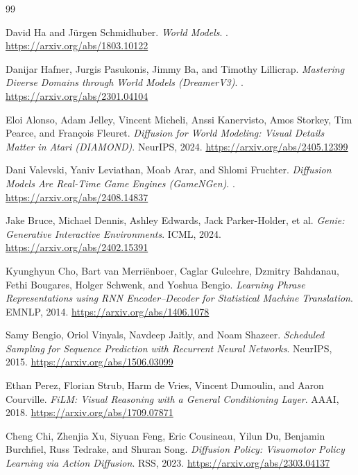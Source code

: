 \documentclass[11pt]{article}
\begin{document}
\newpage
\begin{thebibliography}{99}

David Ha and J\"urgen Schmidhuber.
\newblock \textit{World Models}.
.
\newblock \url{https://arxiv.org/abs/1803.10122}

Danijar Hafner, Jurgis Pasukonis, Jimmy Ba, and Timothy Lillicrap.
\newblock \textit{Mastering Diverse Domains through World Models (DreamerV3)}.
.
\newblock \url{https://arxiv.org/abs/2301.04104}

Eloi Alonso, Adam Jelley, Vincent Micheli, Anssi Kanervisto, Amos Storkey, Tim Pearce, and Fran\c{c}ois Fleuret.
\newblock \textit{Diffusion for World Modeling: Visual Details Matter in Atari (DIAMOND)}.
\newblock NeurIPS, 2024.
\newblock \url{https://arxiv.org/abs/2405.12399}

Dani Valevski, Yaniv Leviathan, Moab Arar, and Shlomi Fruchter.
\newblock \textit{Diffusion Models Are Real-Time Game Engines (GameNGen)}.
.
\newblock \url{https://arxiv.org/abs/2408.14837}

Jake Bruce, Michael Dennis, Ashley Edwards, Jack Parker-Holder, et al.
\newblock \textit{Genie: Generative Interactive Environments}.
\newblock ICML, 2024.
\newblock \url{https://arxiv.org/abs/2402.15391}

Kyunghyun Cho, Bart van Merri\"enboer, Caglar Gulcehre, Dzmitry Bahdanau, Fethi Bougares, Holger Schwenk, and Yoshua Bengio.
\newblock \textit{Learning Phrase Representations using RNN Encoder--Decoder for Statistical Machine Translation}.
\newblock EMNLP, 2014.
\newblock \url{https://arxiv.org/abs/1406.1078}

Samy Bengio, Oriol Vinyals, Navdeep Jaitly, and Noam Shazeer.
\newblock \textit{Scheduled Sampling for Sequence Prediction with Recurrent Neural Networks}.
\newblock NeurIPS, 2015.
\newblock \url{https://arxiv.org/abs/1506.03099}

Ethan Perez, Florian Strub, Harm de Vries, Vincent Dumoulin, and Aaron Courville.
\newblock \textit{FiLM: Visual Reasoning with a General Conditioning Layer}.
\newblock AAAI, 2018.
\newblock \url{https://arxiv.org/abs/1709.07871}

Cheng Chi, Zhenjia Xu, Siyuan Feng, Eric Cousineau, Yilun Du, Benjamin Burchfiel, Russ Tedrake, and Shuran Song.
\newblock \textit{Diffusion Policy: Visuomotor Policy Learning via Action Diffusion}.
\newblock RSS, 2023.
\newblock \url{https://arxiv.org/abs/2303.04137}

\end{thebibliography}
\end{document}
